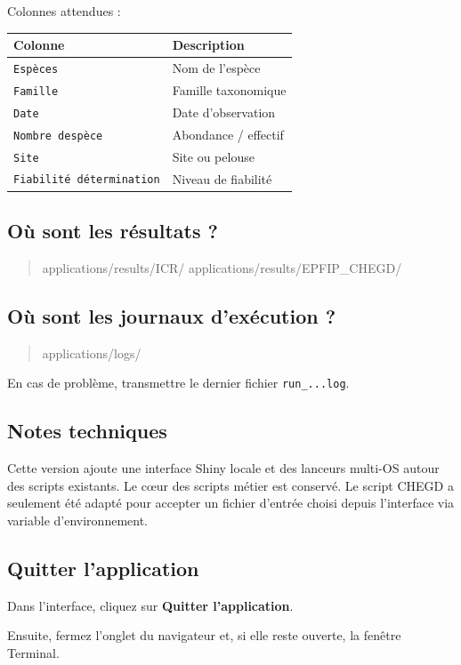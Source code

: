 \documentclass[11pt,a4paper]{article}
\newenvironment{Shaded}{\begin{quote}}{\end{quote}}
\newcommand{\NormalTok}[1]{#1}
\begin{document}
Colonnes attendues :

{%
\begin{longtable}[]{@{}ll@{}}
\toprule\noalign{}
Colonne & Description \\
\midrule\noalign{}
\endhead
\bottomrule\noalign{}
\endlastfoot
\texttt{Espèces} & Nom de l'espèce \\
\texttt{Famille} & Famille taxonomique \\
\texttt{Date} & Date d'observation \\
\texttt{Nombre\ d\textquotesingle{}espèce} & Abondance / effectif \\
\texttt{Site} & Site ou pelouse \\
\texttt{Fiabilité\ détermination} & Niveau de fiabilité \\
\end{longtable}
}

\subsection{Où sont les résultats ?}\label{ouxf9-sont-les-ruxe9sultats}

\begin{Shaded}
\begin{Highlighting}[]
\NormalTok{applications/results/ICR/}
\NormalTok{applications/results/EPFIP\_CHEGD/}
\end{Highlighting}
\end{Shaded}

\subsection{Où sont les journaux d'exécution
?}\label{ouxf9-sont-les-journaux-dexuxe9cution}

\begin{Shaded}
\begin{Highlighting}[]
\NormalTok{applications/logs/}
\end{Highlighting}
\end{Shaded}

En cas de problème, transmettre le dernier fichier \texttt{run\_...log}.

\subsection{Notes techniques}\label{notes-techniques}

Cette version ajoute une interface Shiny locale et des lanceurs multi-OS
autour des scripts existants. Le cœur des scripts métier est conservé.
Le script CHEGD a seulement été adapté pour accepter un fichier d'entrée
choisi depuis l'interface via variable d'environnement.

\subsection{Quitter l'application}\label{quitter-lapplication}

Dans l'interface, cliquez sur \textbf{Quitter l'application}.

Ensuite, fermez l'onglet du navigateur et, si elle reste ouverte, la
fenêtre Terminal.
\end{document}
